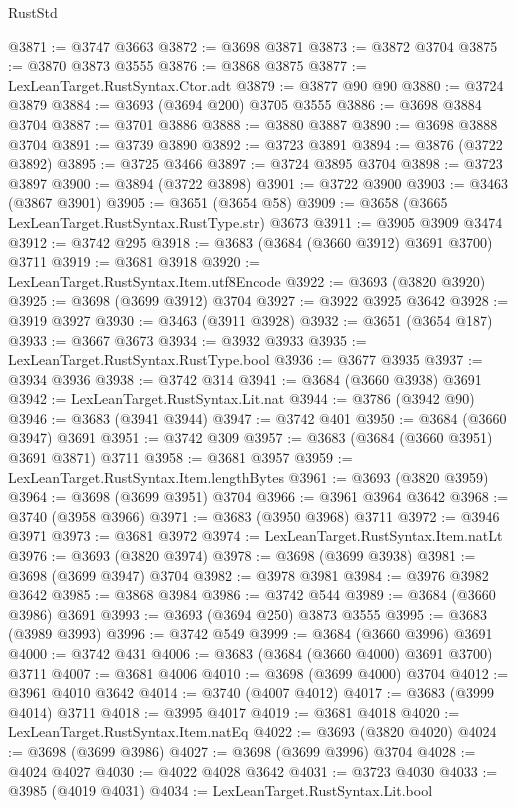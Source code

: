 \begin{lexlean}{RustStd}
\begin{coremodule}
{\begin{coremodule}
{{{{{{{{{{{{{{{{{{{{{{{{{{{{{{{{{{{{{{{{{{{{{{{@3871 := @3747 @3663
@3872 := @3698 @3871
@3873 := @3872 @3704
@3875 := @3870 @3873 @3555
@3876 := @3868 @3875
@3877 := LexLeanTarget.RustSyntax.Ctor.adt
@3879 := @3877 @90 @90
@3880 := @3724 @3879
@3884 := @3693 (@3694 @200) @3705 @3555
@3886 := @3698 @3884 @3704
@3887 := @3701 @3886
@3888 := @3880 @3887
@3890 := @3698 @3888 @3704
@3891 := @3739 @3890
@3892 := @3723 @3891
@3894 := @3876 (@3722 @3892)
@3895 := @3725 @3466
@3897 := @3724 @3895 @3704
@3898 := @3723 @3897
@3900 := @3894 (@3722 @3898)
@3901 := @3722 @3900
@3903 := @3463 (@3867 @3901)
@3905 := @3651 (@3654 @58)
@3909 := @3658 (@3665 LexLeanTarget.RustSyntax.RustType.str) @3673
@3911 := @3905 @3909 @3474
@3912 := @3742 @295
@3918 := @3683 (@3684 (@3660 @3912) @3691 @3700) @3711
@3919 := @3681 @3918
@3920 := LexLeanTarget.RustSyntax.Item.utf8Encode
@3922 := @3693 (@3820 @3920)
@3925 := @3698 (@3699 @3912) @3704
@3927 := @3922 @3925 @3642
@3928 := @3919 @3927
@3930 := @3463 (@3911 @3928)
@3932 := @3651 (@3654 @187)
@3933 := @3667 @3673
@3934 := @3932 @3933
@3935 := LexLeanTarget.RustSyntax.RustType.bool
@3936 := @3677 @3935
@3937 := @3934 @3936
@3938 := @3742 @314
@3941 := @3684 (@3660 @3938) @3691
@3942 := LexLeanTarget.RustSyntax.Lit.nat
@3944 := @3786 (@3942 @90)
@3946 := @3683 (@3941 @3944)
@3947 := @3742 @401
@3950 := @3684 (@3660 @3947) @3691
@3951 := @3742 @309
@3957 := @3683 (@3684 (@3660 @3951) @3691 @3871) @3711
@3958 := @3681 @3957
@3959 := LexLeanTarget.RustSyntax.Item.lengthBytes
@3961 := @3693 (@3820 @3959)
@3964 := @3698 (@3699 @3951) @3704
@3966 := @3961 @3964 @3642
@3968 := @3740 (@3958 @3966)
@3971 := @3683 (@3950 @3968) @3711
@3972 := @3946 @3971
@3973 := @3681 @3972
@3974 := LexLeanTarget.RustSyntax.Item.natLt
@3976 := @3693 (@3820 @3974)
@3978 := @3698 (@3699 @3938)
@3981 := @3698 (@3699 @3947) @3704
@3982 := @3978 @3981
@3984 := @3976 @3982 @3642
@3985 := @3868 @3984
@3986 := @3742 @544
@3989 := @3684 (@3660 @3986) @3691
@3993 := @3693 (@3694 @250) @3873 @3555
@3995 := @3683 (@3989 @3993)
@3996 := @3742 @549
@3999 := @3684 (@3660 @3996) @3691
@4000 := @3742 @431
@4006 := @3683 (@3684 (@3660 @4000) @3691 @3700) @3711
@4007 := @3681 @4006
@4010 := @3698 (@3699 @4000) @3704
@4012 := @3961 @4010 @3642
@4014 := @3740 (@4007 @4012)
@4017 := @3683 (@3999 @4014) @3711
@4018 := @3995 @4017
@4019 := @3681 @4018
@4020 := LexLeanTarget.RustSyntax.Item.natEq
@4022 := @3693 (@3820 @4020)
@4024 := @3698 (@3699 @3986)
@4027 := @3698 (@3699 @3996) @3704
@4028 := @4024 @4027
@4030 := @4022 @4028 @3642
@4031 := @3723 @4030
@4033 := @3985 (@4019 @4031)
@4034 := LexLeanTarget.RustSyntax.Lit.bool
}}}}}}}}}}}}}}}}}}}}}}}}}}}}}}}}}}}}}}}}}}}}}}}
\end{coremodule}}
\end{coremodule}
\end{lexlean}
